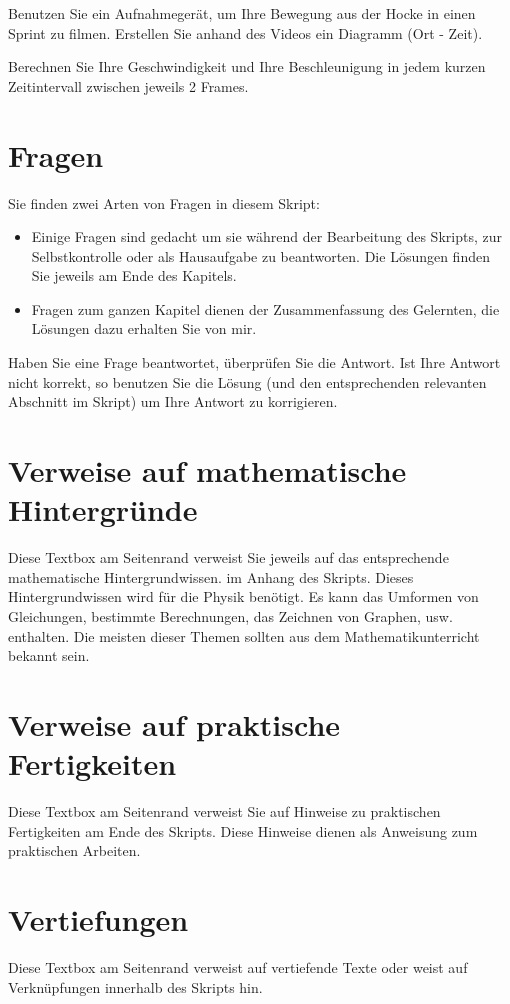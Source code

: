 \documentclass[11pt]{scrbook}
\begin{document}
\begin{Activity}%
Benutzen Sie ein Aufnahmegerät, um Ihre Bewegung aus der Hocke in einen Sprint zu filmen. Erstellen Sie anhand des Videos ein Diagramm (Ort - Zeit).

Berechnen Sie Ihre Geschwindigkeit und Ihre Beschleunigung in jedem kurzen Zeitintervall zwischen jeweils 2 Frames.
\end{Activity}

\section{Fragen}
Sie finden zwei Arten von Fragen in diesem Skript:
\begin{itemize}
\item Einige Fragen sind gedacht um sie während der Bearbeitung des Skripts, zur Selbstkontrolle oder als Hausaufgabe zu beantworten. Die Lösungen finden Sie jeweils am Ende des Kapitels.
\item Fragen zum ganzen Kapitel dienen der Zusammenfassung des Gelernten, die Lösungen dazu erhalten Sie von mir.
\end{itemize}
Haben Sie eine Frage beantwortet, überprüfen Sie die Antwort. Ist Ihre Antwort nicht korrekt, so benutzen Sie die Lösung (und den entsprechenden relevanten Abschnitt im Skript) um Ihre Antwort zu korrigieren. 

\section{Verweise auf mathematische Hintergründe}
Diese Textbox am Seitenrand verweist Sie jeweils auf das entsprechende mathematische Hinter\-grund\-wissen. im Anhang des Skripts. Dieses Hinter\-grund\-wissen wird für die Physik benötigt. Es kann das Umformen von Gleichungen, bestimmte Berechnungen, das Zeichnen von Graphen, usw. enthalten. Die meisten dieser Themen sollten aus dem Mathematikunterricht bekannt sein. 

\section{Verweise auf praktische Fertigkeiten}
Diese Textbox am Seitenrand verweist Sie auf Hinweise zu praktischen Fertigkeiten am Ende des Skripts. Diese Hinweise dienen als Anweisung zum praktischen Arbeiten. 

\section{Vertiefungen}
Diese Textbox am Seitenrand verweist auf vertiefende Texte oder weist auf Verknüpfungen innerhalb des Skripts hin.
\end{document}
